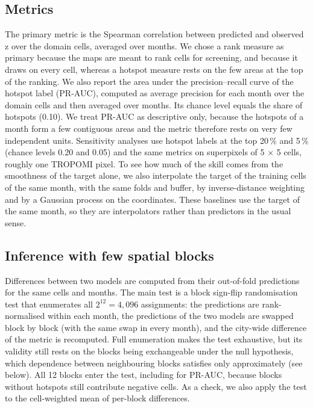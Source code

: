 \documentclass[pdflatex,sn-basic]{sn-jnl}
\begin{document}
\subsection{Metrics}\label{sec:metrics}

The primary metric is the Spearman correlation between predicted and observed z over the domain cells, averaged over months. We chose a rank measure as primary because the maps are meant to rank cells for screening, and because it draws on every cell, whereas a hotspot measure rests on the few areas at the top of the ranking. We also report the area under the precision--recall curve of the hotspot label (PR-AUC), computed as average precision for each month over the domain cells and then averaged over months. Its chance level equals the share of hotspots (0.10). We treat PR-AUC as descriptive only, because the hotspots of a month form a few contiguous areas and the metric therefore rests on very few independent units. Sensitivity analyses use hotspot labels at the top 20\,\% and 5\,\% (chance levels 0.20 and 0.05) and the same metrics on superpixels of 5 × 5 cells, roughly one TROPOMI pixel. To see how much of the skill comes from the smoothness of the target alone, we also interpolate the target of the training cells of the same month, with the same folds and buffer, by inverse-distance weighting and by a Gaussian process on the coordinates. These baselines use the target of the same month, so they are interpolators rather than predictors in the usual sense.

\subsection{Inference with few spatial blocks}\label{sec:inference}

Differences between two models are computed from their out-of-fold predictions for the same cells and months. The main test is a block sign-flip randomisation test that enumerates all $2^{12} = 4{,}096$ assignments: the predictions are rank-normalised within each month, the predictions of the two models are swapped block by block (with the same swap in every month), and the city-wide difference of the metric is recomputed. Full enumeration makes the test exhaustive, but its validity still rests on the blocks being exchangeable under the null hypothesis, which dependence between neighbouring blocks satisfies only approximately (see below). All 12 blocks enter the test, including for PR-AUC, because blocks without hotspots still contribute negative cells. As a check, we also apply the test to the cell-weighted mean of per-block differences.
\end{document}
